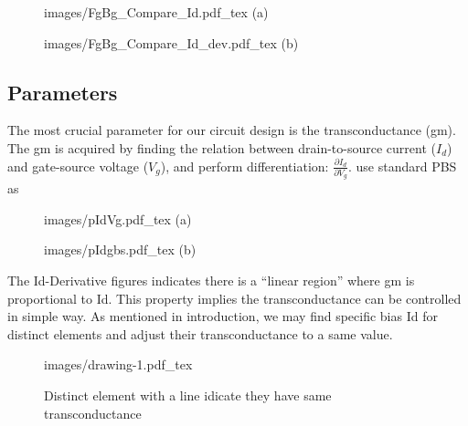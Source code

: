 \begin{figure}[!htbp]
    \centering
    \begin{minipage}[t][0.1\textheight]{1\textwidth}
        \centering
        \def\svgwidth{10cm}
        \fontsize{6}{15}\selectfont
         {images/FgBg_Compare_Id.pdf_tex}
        (a)
    \end{minipage}
    \vfill
    \begin{minipage}[t][0.1\textheight]{1\textwidth}
        \centering
        \def\svgwidth{10cm}
        \fontsize{6}{15}\selectfont
         {images/FgBg_Compare_Id_dev.pdf_tex}
        (b)
    \end{minipage}
    \caption{}
    \label{fig:res}
\end{figure}

\subsection{Parameters}
The most crucial parameter for our circuit design is the transconductance (gm).
{\color{red}
    The gm is acquired by finding the relation between drain-to-source current ($I_d$) and gate-source voltage ($V_g$), and perform differentiation: $\frac{\partial I_d}{\partial V_g}$.
    use standard PBS as
}

\begin{figure}[!htbp]
    \centering
    \begin{minipage}[t][0.1\textheight]{1\textwidth}
        \centering
        \def\svgwidth{10cm}
        \fontsize{10}{20}\selectfont
         {images/pIdVg.pdf_tex}
        (a)
    \end{minipage}
    \hfill
    \begin{minipage}[t][0.1\textheight]{1\textwidth}
        \centering
        \def\svgwidth{10cm}
        \fontsize{10}{20}\selectfont
         {images/pIdgbs.pdf_tex}
        (b)
    \end{minipage}
    \caption{}
    \label{fig:res}
\end{figure}

The Id-Derivative figures indicates there is a ``linear region'' where gm is proportional to Id.
This property implies the transconductance can be controlled in simple way.
As mentioned in introduction, we may find specific bias Id for distinct elements and adjust their transconductance to a same value.

\begin{figure}[!htbp]
    \centering
        \def\svgwidth{10cm}
        \fontsize{10}{20}\selectfont
         {images/drawing-1.pdf_tex}
    \fontsize{6}{7}\selectfont
    \caption{Distinct element with a line idicate they have same transconductance}
    \label{fig:res}
\end{figure}

